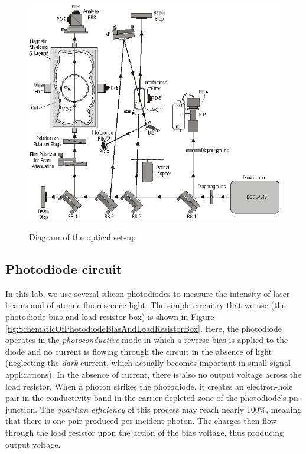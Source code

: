 \documentclass{../lab}
\begin{document}


\begin{figure}[h]
    \centering
    \href{http://experimentationlab.berkeley.edu/sites/default/files/images/MNOimage003.gif}{\includegraphics[width=0.7\linewidth]{images/MNOimage003.png}}
    \caption{Diagram of the optical set-up}
    \label{fig:DiagramOfOpticalSetup}
\end{figure}

\newpage

\subsection{Photodiode circuit}

In this lab, we use several silicon photodiodes to measure the intensity of laser beams and of atomic fluorescence light. The simple circuitry that we use (the photodiode bias and load resistor box) is shown in Figure \ref{fig:SchematicOfPhotodiodeBiasAndLoadResistorBox}. Here, the photodiode operates in the \emph{photoconductive} mode in which a reverse bias is applied to the diode and no current is flowing through the circuit in the absence of light (neglecting the \emph{dark} current, which actually becomes important in small-signal applications). In the absence of current, there is also no output voltage across the load resistor. When a photon strikes the photodiode, it creates an electron-hole pair in the conductivity band in the carrier-depleted zone of the photodiode's pn-junction. The \emph{quantum efficiency} of this process may reach nearly 100\%, meaning that there is one pair produced per incident photon. The charges then flow through the load resistor upon the action of the bias voltage, thus producing output voltage.
\end{document}
